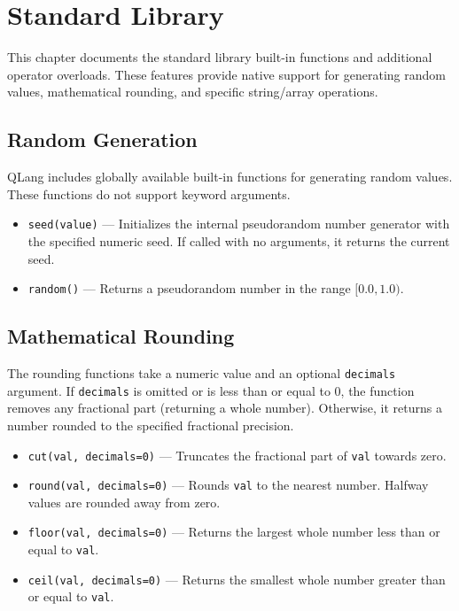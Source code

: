 \section{Standard Library}\label{sec:standard-library}

This chapter documents the standard library built-in functions and additional operator overloads. These features provide native support for generating random values, mathematical rounding, and specific string/array operations.

\subsection{Random Generation}\label{sec:random-generation}

QLang includes globally available built-in functions for generating random values. These functions do not support keyword arguments.

\begin{itemize}
    \item \texttt{seed(value)} — Initializes the internal pseudorandom number generator with the specified numeric seed. If called with no arguments, it returns the current seed.
    \item \texttt{random()} — Returns a pseudorandom number in the range $[0.0, 1.0)$.
\end{itemize}

\subsection{Mathematical Rounding}\label{sec:math-rounding}

The rounding functions take a numeric value and an optional \texttt{decimals} argument. If \texttt{decimals} is omitted or is less than or equal to $0$, the function removes any fractional part (returning a whole number). Otherwise, it returns a number rounded to the specified fractional precision.

\begin{itemize}
    \item \texttt{cut(val, decimals=0)} — Truncates the fractional part of \texttt{val} towards zero.
    \item \texttt{round(val, decimals=0)} — Rounds \texttt{val} to the nearest number. Halfway values are rounded away from zero.
    \item \texttt{floor(val, decimals=0)} — Returns the largest whole number less than or equal to \texttt{val}.
    \item \texttt{ceil(val, decimals=0)} — Returns the smallest whole number greater than or equal to \texttt{val}.
\end{itemize}

